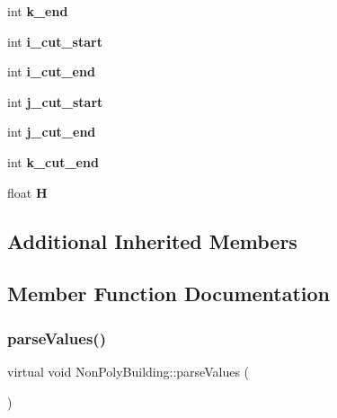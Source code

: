 \begin{DoxyCompactItemize}
int {\bfseries k\+\_\+end}
\item 
\mbox{\label{classNonPolyBuilding_a63d89a349607e6c72eeff359ca869921}} 
int {\bfseries i\+\_\+cut\+\_\+start}
\item 
\mbox{\label{classNonPolyBuilding_abf875cb22fdd4bba2a673845e1d7f320}} 
int {\bfseries i\+\_\+cut\+\_\+end}
\item 
\mbox{\label{classNonPolyBuilding_a7258b062bc3d755772d5cda15a2bb3ed}} 
int {\bfseries j\+\_\+cut\+\_\+start}
\item 
\mbox{\label{classNonPolyBuilding_ab49ed1020318238c329b71c970e2fdc7}} 
int {\bfseries j\+\_\+cut\+\_\+end}
\item 
\mbox{\label{classNonPolyBuilding_ac8cd541903d56d398c6df5d279c00d99}} 
int {\bfseries k\+\_\+cut\+\_\+end}
\item 
\mbox{\label{classNonPolyBuilding_a7bdddbe9ef9948491e0560310e4afd60}} 
float {\bfseries H}
\end{DoxyCompactItemize}
\subsection*{Additional Inherited Members}


\subsection{Member Function Documentation}
\mbox{\label{classNonPolyBuilding_ace133756e0233d75b434fec5273b4414}} 
\subsubsection{\texorpdfstring{parse\+Values()}{parseValues()}}
{\footnotesize\ttfamily virtual void Non\+Poly\+Building\+::parse\+Values (\begin{DoxyParamCaption}{ }\end{DoxyParamCaption})\hspace{0.3cm}{\ttfamily [pure virtual]}}

